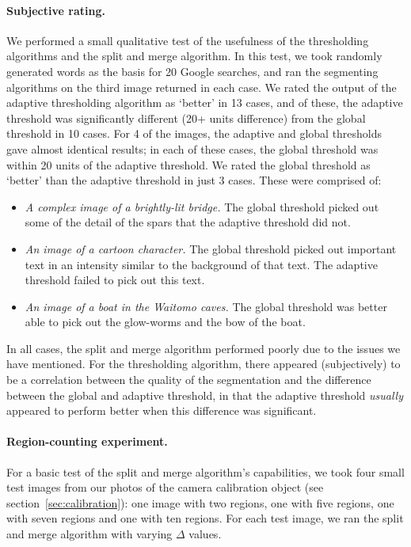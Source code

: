 \paragraph{Subjective rating.}
We performed a small qualitative test of the usefulness of the thresholding algorithms and the split and merge algorithm. In this test, we took randomly generated words as the basis for 20 Google searches, and ran the segmenting algorithms on the third image returned in each case. We rated the output of the adaptive thresholding algorithm as `better' in 13 cases, and of these, the adaptive threshold was significantly different (20+ units difference) from the global threshold in 10 cases. For 4 of the images, the adaptive and global thresholds gave almost identical results; in each of these cases, the global threshold was within 20 units of the adaptive threshold. We rated the global threshold as `better' than the adaptive threshold in just 3 cases. These were comprised of:
\begin{itemize}
   \item \emph{A complex image of a brightly-lit bridge.} The global threshold picked out some of the detail of the spars that the adaptive threshold did not.
   \item \emph{An image of a cartoon character.} The global threshold picked out important text in an intensity similar to the background of that text. The adaptive threshold failed to pick out this text.
   \item \emph{An image of a boat in the Waitomo caves.} The global threshold was better able to pick out the glow-worms and the bow of the boat.
\end{itemize}
In all cases, the split and merge algorithm performed poorly due to the issues we have mentioned. For the thresholding algorithm, there appeared (subjectively) to be a correlation between the quality of the segmentation and the difference between the global and adaptive threshold, in that the adaptive threshold \emph{usually} appeared to perform better when this difference was significant.

\paragraph{Region-counting experiment.}
For a basic test of the split and merge algorithm's capabilities, we took four small test images from our photos of the camera calibration object (see section~\ref{sec:calibration}): one image with two regions, one with five regions, one with seven regions and one with ten regions. For each test image, we ran the split and merge algorithm with varying $\Delta$ values.

